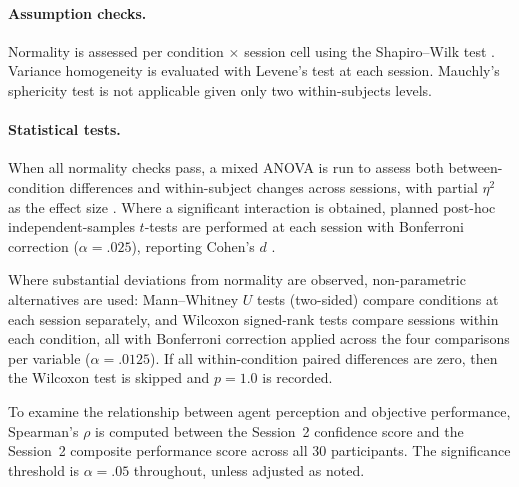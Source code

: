 \paragraph{Assumption checks.}
Normality is assessed per condition $\times$ session cell using the Shapiro--Wilk test \cite{Shapiro1965}. Variance homogeneity is evaluated with Levene's test \cite{Levene1960} at each session. Mauchly's sphericity test is not applicable given only two within-subjects levels.

\paragraph{Statistical tests.}
When all normality checks pass, a mixed ANOVA is run to assess both between-condition differences and within-subject changes across sessions, with partial $\eta^2$ as the effect size \cite{Cohen1988}. Where a significant interaction is obtained, planned post-hoc independent-samples $t$-tests are performed at each session with Bonferroni correction ($\alpha = .025$), reporting Cohen's $d$ \cite{Cohen1988}.

Where substantial deviations from normality are observed, non-parametric alternatives are used: Mann--Whitney $U$ tests \cite{Mann1947} (two-sided) compare conditions at each session separately, and Wilcoxon signed-rank tests \cite{Wilcoxon1945} compare sessions within each condition, all with Bonferroni correction applied across the four comparisons per variable ($\alpha = .0125$). If all within-condition paired differences are zero, then the Wilcoxon test is skipped and $p = 1.0$ is recorded.

To examine the relationship between agent perception and objective performance, Spearman's $\rho$ \cite{Spearman1904} is computed between the Session~2 confidence score and the Session~2 composite performance score across all 30 participants. The significance threshold is $\alpha = .05$ throughout, unless adjusted as noted.